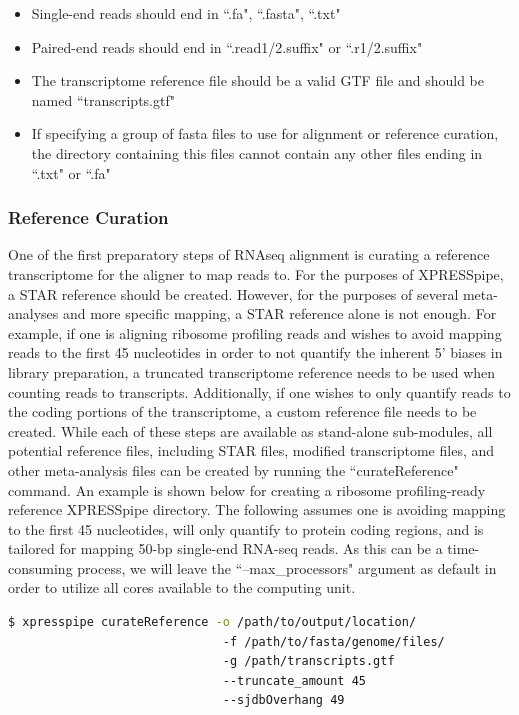\documentclass[11pt, a4paper, oneside]{article}
\begin{document}
\begin{itemize}
\item Single-end reads should end in ``.fa", ``.fasta", ``.txt"
\item Paired-end reads should end in ``.read1/2.suffix" or ``.r1/2.suffix"
\item The transcriptome reference file should be a valid GTF file and should be named ``transcripts.gtf"
\item If specifying a group of fasta files to use for alignment or reference curation, the directory containing this files cannot contain any other files ending in ``.txt" or ``.fa"
\end{itemize}

\subsubsection{Reference Curation}
One of the first preparatory steps of RNAseq alignment is curating a reference transcriptome for the aligner to map reads to. For the purposes of XPRESSpipe, a STAR reference should be created. However, for the purposes of several meta-analyses and more specific mapping, a STAR{} reference alone is not enough. For example, if one is aligning ribosome profiling reads and wishes to avoid mapping reads to the first 45 nucleotides in order to not quantify the inherent 5' biases in library preparation{}, a truncated transcriptome reference needs to be used when counting reads to transcripts. Additionally, if one wishes to only quantify reads to the coding portions of the transcriptome, a custom reference file needs to be created. While each of these steps are available as stand-alone sub-modules, all potential reference files, including STAR files, modified transcriptome files, and other meta-analysis files can be created by running the ``curateReference" command. An example is shown below for creating a ribosome profiling-ready reference XPRESSpipe directory. The following assumes one is avoiding mapping to the first 45 nucleotides, will only quantify to protein coding regions, and is tailored for mapping 50-bp single-end RNA-seq reads. As this can be a time-consuming process, we will leave the ``--max\_processors" argument as default in order to utilize all cores available to the computing unit.
\newline
\begin{lstlisting}[language=bash, caption=curateReference example]
$ xpresspipe curateReference -o /path/to/output/location/
                              -f /path/to/fasta/genome/files/
                              -g /path/transcripts.gtf
                              --truncate_amount 45
                              --sjdbOverhang 49
\end{lstlisting}
\end{document}
